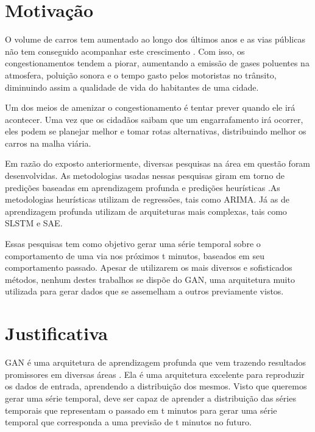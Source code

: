 \section{Motivação}

O volume de carros tem aumentado ao longo dos últimos anos e as vias públicas não tem conseguido acompanhar este crescimento \cite{sindipecas_2019}. Com isso, os congestionamentos tendem a piorar, aumentando a emissão de gases poluentes na atmosfera, poluição sonora e o tempo gasto pelos motoristas no trânsito, diminuindo assim a qualidade de vida do habitantes de uma cidade.

Um dos meios de amenizar o congestionamento é tentar prever quando ele irá acontecer. Uma vez que os cidadãos saibam que um engarrafamento irá ocorrer, eles podem se planejar melhor e tomar rotas alternativas, distribuindo melhor os carros na malha viária.

Em razão do exposto anteriormente, diversas pesquisas na área em questão foram desenvolvidas. As metodologias usadas nessas pesquisas giram em torno de predições baseadas em aprendizagem profunda \cite{Xiaolei_2015} \cite{Zainab_2018} \cite{he2013improving} \cite{wang_2018} \cite{lv_6894591} e predições heurísticas \cite{levin_forecast_1980} \cite{hamed_prediction_1995} \cite{voort_series_1996}.As metodologias heurísticas utilizam de regressões, tais como \acrfull{ARIMA}. Já as de aprendizagem profunda utilizam de arquiteturas mais complexas, tais como \acrfull{SLSTM} e \acrfull{SAE}. 

Essas pesquisas tem como objetivo gerar uma série temporal sobre o comportamento de uma via nos próximos t minutos, baseados em seu comportamento passado. Apesar de utilizarem os mais diversos e sofisticados métodos, nenhum destes trabalhos se dispõe do \acrfull{GAN}, uma arquitetura muito utilizada para gerar dados que se assemelham a outros previamente vistos.

\section{Justificativa}

\acrshort{GAN} é uma arquitetura de aprendizagem profunda que vem trazendo resultados promissores em diversas áreas \cite{christian}. Ela é uma arquitetura excelente para reproduzir os dados de entrada, aprendendo a distribuição dos mesmos. Visto que queremos gerar uma série temporal,  deve ser capaz de aprender a distribuição das séries temporais que representam o passado em t minutos para gerar uma série temporal que corresponda a uma previsão de t minutos no futuro.



